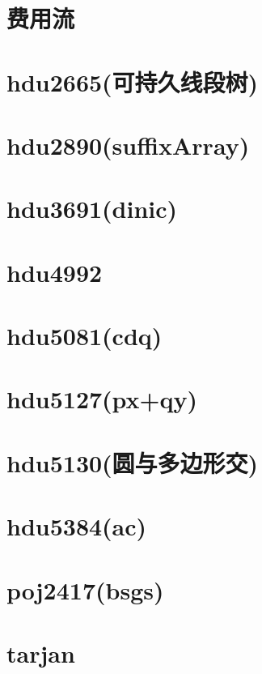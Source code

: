 \documentclass[10pt]{article}
\begin{document}
\tableofcontents
\newpage

\section{费用流}

\section{hdu2665(可持久线段树)}

\section{hdu2890(suffixArray)}

\section{hdu3691(dinic)}

\section{hdu4992}

\section{hdu5081(cdq)}

\section{hdu5127(px+qy)}

\section{hdu5130(圆与多边形交)}

\section{hdu5384(ac)}

\section{poj2417(bsgs)}

\section{tarjan}

\end{document}
